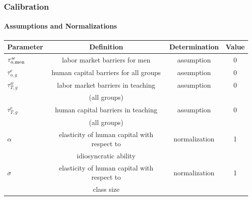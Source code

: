 \documentclass[11pt]{beamer}
\begin{document}
\begin{frame}
\frametitle{Calibration}
\framesubtitle{Assumptions and Normalizations}
\tiny
	
	\begin{table}[h!]
		\centering
		\begin{tabular}{lccc}
			\toprule
			\toprule
			Parameter & Definition & Determination & Value\\
			\midrule
			$\tau^{w}_{o,{\rm men}}$ & labor market barriers for men & assumption & 0 \\
			$\tau^{e}_{o,g}$ & human capital barriers for all groups & assumption & 0 \\
			$\tau^{w}_{T,g}$ & labor market barriers in teaching  & assumption & 0 \\
			& (all groups)& &\\
			$\tau^{e}_{T,g}$ & human capital barriers in teaching & assumption & 0 \\
			& (all groups) & &\\
			$\alpha$ & elasticity of human capital with respect to & normalization & 1 \\
			& idiosyncratic ability & &\\
			$\sigma$ & elasticity of human capital with respect to & normalization & 1 \\
			& class size & &\\
			\bottomrule
		\end{tabular}
		\label{tab:assump}
	\end{table}
\end{frame}
\end{document}
